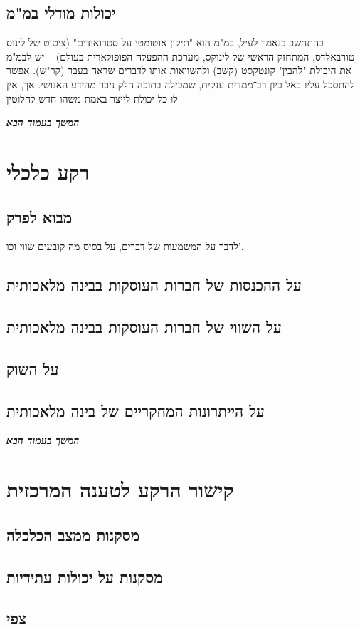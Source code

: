 \documentclass[]{article}
\newcommand\npage {\vfil {\hfil \textbf{\textit{המשך בעמוד הבא}}} \hfil \vfil \pagebreak}
\theoremstyle{definition}
\begin{document}
	
	
	\subsection{יכולות מודלי במ"מ}
	
	בהתחשב בנאמר לעיל, במ"מ הוא "תיקון אוטומטי על סטרואידים" \cite{AutoCorrect} (ציטוט של לינוס טורבאלדס, המתחזק הראשי של לינוקס, מערכת ההפעלה הפופולארית בעולם) – יש לבמ"מ את היכולת "להבין" קונטקסט (קשב) ולהשוואות אותו לדברים שראה בעבר (קר"ש). אפשר להתסכל עליו באל ביון רב־ממדית ענקית, שמכילה בתוכה חלק ניכר מהידע האנושי. אך, אין לו כל יכולת לייצר באמת משהו חדש לחלוטין
	
	\npage
	\section{רקע כלכלי}
	\subsection{מבוא לפרק}
	לדבר על המשמעות של דברים, על בסיס מה קובעים שווי וכו'. 
	\subsection{על ההכנסות של חברות העוסקות בבינה מלאכותית}
	\subsection{על השווי של חברות העוסקות בבינה מלאכותית}
	\subsection{על השוק}
	\subsection{על הייתרונות המחקריים של בינה מלאכותית}
	
	\npage
	\section{קישור הרקע לטענה המרכזית}
	\subsection{מסקנות ממצב הכלכלה}
	\subsection{מסקנות על יכולות עתידיות}
	\subsection{צפי}
	
\end{document}
